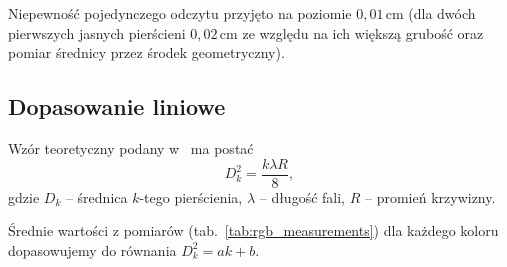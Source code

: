 \documentclass[12pt]{article}
\begin{document}
Niepewność pojedynczego odczytu przyjęto na poziomie \(0{,}01\,\mathrm{cm}\) (dla dwóch pierwszych jasnych pierścieni \(0{,}02\,\mathrm{cm}\) ze względu na ich większą grubość oraz pomiar średnicy przez środek geometryczny).

\subsection{Dopasowanie liniowe}

Wzór teoretyczny podany w~\cite{skrypt} ma postać
\begin{equation}
	D_k^2 = \frac{k \lambda R}{8},
	\label{eq:radius}
\end{equation}
gdzie \(D_k\) – średnica \(k\)-tego pierścienia, \(\lambda\) – długość fali, \(R\) – promień krzywizny.

Średnie wartości z pomiarów (tab.~\ref{tab:rgb_measurements}) dla każdego koloru dopasowujemy do równania \(D_k^2 = a k + b\).
\end{document}
